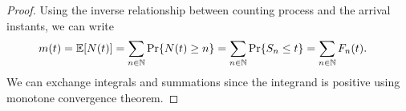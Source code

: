 \documentclass[a4paper,10pt, english]{article}
\begin{document}
\begin{proof} 
Using the inverse relationship between counting process and the arrival instants, we can write 
\begin{align*}
m(t) &= \mathbb{E}[N(t)] = \sum_{n \in \mathbb{N}} \Pr\{N(t) \geq n\} = \sum_{n \in \mathbb{N}} \Pr\{S_n \leq t\} = \sum_{n \in \mathbb{N}} F_n(t).
\end{align*}
We can exchange integrals and summations since the integrand is positive using monotone convergence theorem.
\end{proof}
\end{document}
